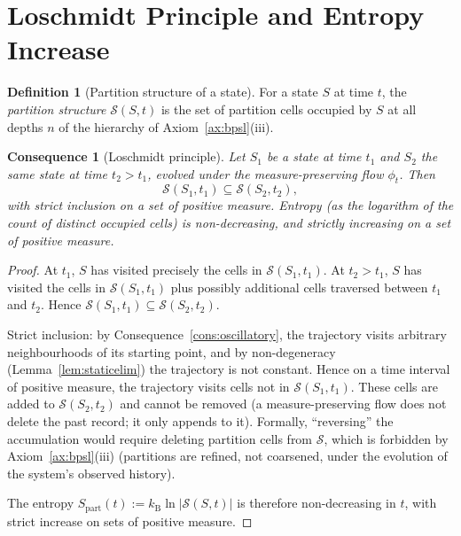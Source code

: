 \documentclass[11pt,twocolumn,a4paper]{article}
\theoremstyle{axiomstyle}
\theoremstyle{conseqstyle}
\newtheorem{consequence}{Consequence}
\theoremstyle{definition}
\newtheorem{definition}{Definition}
\theoremstyle{remark}
\newcommand{\kB}{k_{\mathrm{B}}}
\newcommand{\Sspace}{\mathcal{S}}
\begin{document}
\section{Loschmidt Principle and Entropy Increase}
\label{sec:loschmidt}

\begin{definition}[Partition structure of a state]
\label{def:partstruct}
For a state $S$ at time $t$, the \emph{partition structure} $\Sspace(S,t)$ is the set of partition cells occupied by $S$ at all depths $n$ of the hierarchy of Axiom~\ref{ax:bpsl}(iii).
\end{definition}

\begin{consequence}[Loschmidt principle]
\label{cons:loschmidt}
Let $S_{1}$ be a state at time $t_{1}$ and $S_{2}$ the same state at time $t_{2}>t_{1}$, evolved under the measure-preserving flow $\phi_{t}$. Then
\begin{equation}
\Sspace(S_{1},t_{1})\subseteq\Sspace(S_{2},t_{2}),
\label{eq:loschmidt}
\end{equation}
with strict inclusion on a set of positive measure. Entropy (as the logarithm of the count of distinct occupied cells) is non-decreasing, and strictly increasing on a set of positive measure.
\end{consequence}

\begin{proof}
At $t_{1}$, $S$ has visited precisely the cells in $\Sspace(S_{1},t_{1})$. At $t_{2}>t_{1}$, $S$ has visited the cells in $\Sspace(S_{1},t_{1})$ plus possibly additional cells traversed between $t_{1}$ and $t_{2}$. Hence $\Sspace(S_{1},t_{1})\subseteq\Sspace(S_{2},t_{2})$.

Strict inclusion: by Consequence~\ref{cons:oscillatory}, the trajectory visits arbitrary neighbourhoods of its starting point, and by non-degeneracy (Lemma~\ref{lem:staticelim}) the trajectory is not constant. Hence on a time interval of positive measure, the trajectory visits cells not in $\Sspace(S_{1},t_{1})$. These cells are added to $\Sspace(S_{2},t_{2})$ and cannot be removed (a measure-preserving flow does not delete the past record; it only appends to it). Formally, ``reversing'' the accumulation would require deleting partition cells from $\Sspace$, which is forbidden by Axiom~\ref{ax:bpsl}(iii) (partitions are refined, not coarsened, under the evolution of the system's observed history).

The entropy $S_{\mathrm{part}}(t):=\kB\ln|\Sspace(S,t)|$ is therefore non-decreasing in $t$, with strict increase on sets of positive measure.
\end{proof}
\end{document}
